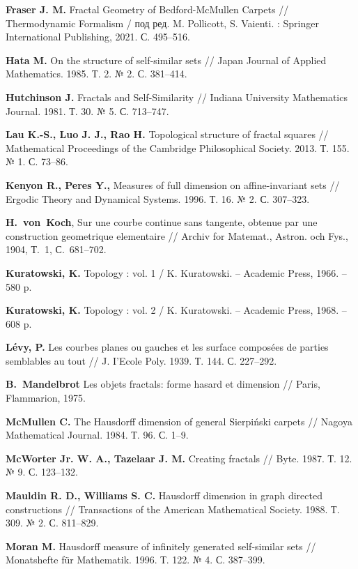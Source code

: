 \begin{thebibliography}{99}
{\bf Fraser J. M. }
Fractal Geometry of Bedford-McMullen Carpets // 
Thermodynamic Formalism / под ред. M. Pollicott, S. Vaienti. : Springer International Publishing, 2021. С. 495--516.

{\bf Hata M. }
On the structure of self-similar sets // 
Japan Journal of Applied Mathematics. 1985. Т. 2. № 2. С. 381–414.

{\bf Hutchinson J. }
Fractals and Self-Similarity // 
Indiana University Mathematics Journal. 1981. Т. 30. № 5. С. 713–747.

{\bf Lau K.-S., Luo J. J., Rao H. }
Topological structure of fractal squares // 
Mathematical Proceedings of the Cambridge Philosophical Society. 2013. Т. 155. № 1. С. 73--86.

{\bf Kenyon R., Peres Y.,} 
Measures of full dimension on affine-invariant sets // 
Ergodic Theory and Dynamical Systems. 1996. Т. 16. № 2. С. 307–323.

{\bf H.~von~Koch},  
Sur une courbe continue sans tangente, obtenue par
une construction geometrique elementaire // 
Archiv for Matemat., Astron. och Fys., 1904, Т.~1, С.~681--702.

{\bf Kuratowski, K.} 
Topology : vol. 1 / 
K. Kuratowski. -- Academic Press, 1966. -- 580 p.

{\bf Kuratowski, K.} 
Topology : vol. 2 / 
K. Kuratowski. -- Academic Press, 1968. -- 608 p.

{\bf L{\'e}vy, P.} 
Les courbes planes ou gauches et les surface compos{\'e}es de parties semblables au tout // 
J. I’Ecole Poly. 1939. Т. 144. С. 227--292.

{\bf B.~Mandelbrot} 
Les objets fractals: forme hasard et dimension // 
Paris, Flammarion, 1975.

{\bf McMullen C. }
The Hausdorff dimension of general Sierpiński carpets // 
Nagoya Mathematical Journal. 1984. Т. 96. С. 1–9.

{\bf McWorter Jr. W. A., Tazelaar J. M.}
Creating fractals // 
Byte. 1987. Т. 12. № 9. С. 123--132.

{\bf Mauldin R. D., Williams S. C.}
Hausdorff dimension in graph directed constructions // 
Transactions of the American Mathematical Society. 1988. Т. 309. № 2. С. 811--829.

{\bf Moran M.}
Hausdorff measure of infinitely generated self-similar sets // 
Monatshefte für Mathematik. 1996. Т. 122. № 4. С. 387--399.


\end{thebibliography}
